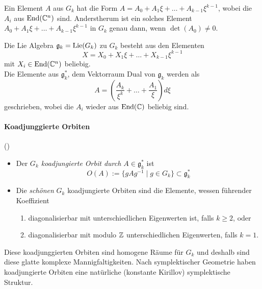 Ein Element $A$ aus $G_k$ hat die Form $A=A_0+A_1\xi+\dots+A_{k-1}\xi^{k-1}$,
wobei die $A_i$ aus $\operatorname{End}(\mathbb{C}^n)$ sind. Anderstherum ist ein solches Element
$A_0+A_1\xi+\dots+A_{k-1}\xi^{k-1}$ in $G_k$ genau dann, wenn $\det(A_0)\neq0$.
\begin{comment}
Zu Zeigen: $\det(\sum^{k-1}_{i=0}A_{i}\xi^{i})\neq 0$ $\Leftrightarrow$
$\det(A_0)\neq0$.\\
\textbf{Denn} $\det(\sum^{k-1}_{i=0}A_{i}\xi^{i})=\overset{\text{\color{red}?}}\dots
=\det(A_0)$.
\end{comment}
Die Lie Algebra $\mathfrak g_k=\operatorname{Lie}(G_k)$ zu $G_k$ besteht aus den Elementen
\[
X=X_0+X_1\xi+\dots+X_{k-1}\xi^{k-1}
\]
mit $X_i\in\operatorname{End}(\mathbb{C}^n)$ beliebig.\\
Die Elemente aus $\mathfrak g_k^*$, dem Vektorraum Dual von $\mathfrak g_k$
werden als
\[
A=\left(\frac{A_{k}}{\xi^{k}}+\dots+\frac{A_{1}}{\xi}\right)d\xi
\]
geschrieben, wobei die $A_i$ wieder aus $\operatorname{End}(\mathbb{C})$ beliebig sind. 
\begin{comment}
\ccite[p. 22]{thboalch}
Die Paarung zwischen $\mathfrak g_k^*$ und $\mathfrak g_k$ ist gegeben durch
\[
<A,X>=\Res_0(\Tr(AX))=\sum^{k}_{i=1}\Tr(A_iX_{i-1})
\]
Wobei $\Res_0$ die Residuen Abbildung ist, welche den Koeffizient vor
$d\xi/\xi$ ausgibt.
\textbf{Observe that the product $AX$ is a well defined element of $\mathfrak
g_k^∗$, where $A\in\mathfrak g_k^*$ and $X\in\mathfrak g_k$.}
Ähnlich ist das Produkt $XA$ wohldefiniert in $\mathfrak g_k^∗$. Damit ist
$\mathfrak g_k^*$ ein Bimodul über $\mathfrak g_k$.
\end{comment}

\paragraph{Koadjunggierte Orbiten} (\cite[pp.23-26]{thboalch})
\begin{defn}
\begin{itemize}
\item
Der \emph{$G_k$ koadjungierte Orbit durch $A\in\mathfrak g_k^*$} ist
\[
O(A):=\{gAg^{-1}\mid g\in G_k\}\subset\mathfrak g_k^*
\]
\item
Die \emph{schönen} $G_k$ koadjungierte Orbiten sind die Elemente, wessen
führender Koeffizient
\begin{enumerate}
\item
diagonalisierbar mit unterschiedlichen Eigenwerten ist, falls $k\geq2$, oder
\item
diagonalisierbar mit modulo $\mathbb{Z}$ unterschiedlichen Eigenwerten, falls $k=1$.
\end{enumerate}
\end{itemize}
\end{defn}
Diese koadjunggierten Orbiten sind homogene Räume für $G_k$ und deshalb sind
diese glatte komplexe Mannigfaltigkeiten.
Nach symplektischer Geometrie haben koadjungierte Orbiten eine natürliche
(konstante Kirillov) symplektische Struktur.

